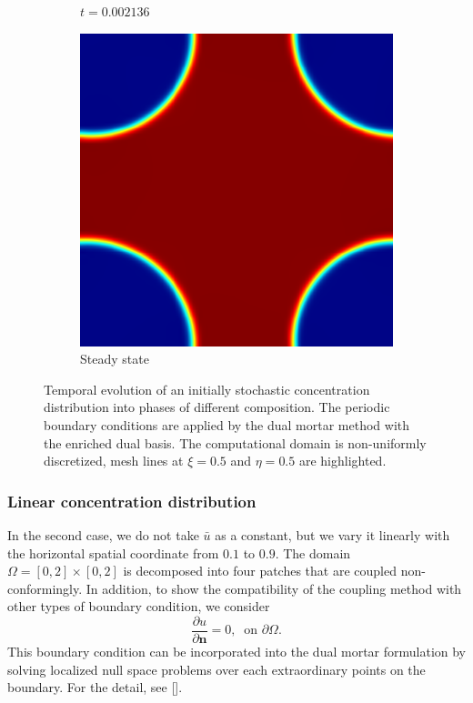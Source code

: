 \begin{figure}[ht]
\begin{subfigure}[t]{.3\linewidth}
		\vspace{-.4\baselineskip}
		\caption{{$t=0.002136$}}
	\end{subfigure}
	\begin{subfigure}[t]{.3\linewidth}
		\center
		\includegraphics[scale=.25]{stochastic_ch_8}
		\vspace{-.4\baselineskip}
		\caption{Steady state}
	\end{subfigure}
	\caption{Temporal evolution of an initially stochastic concentration distribution into phases of different composition. The periodic boundary conditions are applied by the dual mortar method with the enriched dual basis. The computational domain is non-uniformly discretized, mesh lines at $\xi=0.5$ and $\eta=0.5$ are highlighted.}\label{fig:phase_field_stochastic}
\end{figure}

\subsubsection{Linear concentration distribution}

In the second case, we do not take $\bar{u}$ as a constant, but we vary it linearly with the horizontal spatial coordinate from $0.1$ to $0.9$. The domain $\Omega = \left[ 0, 2 \right] \times \left[ 0, 2 \right]$ is decomposed into four patches that are coupled non-conformingly. In addition, to show the compatibility of the coupling method with other types of boundary condition, we consider
\begin{equation}
	\frac{ \partial u}{ \partial \mathbf{n}} = 0, \;\; \text{on }\partial \Omega.
\end{equation}
This boundary condition can be incorporated into the dual mortar formulation by solving localized null space problems over each extraordinary points on the boundary. For the detail, see []. \par


